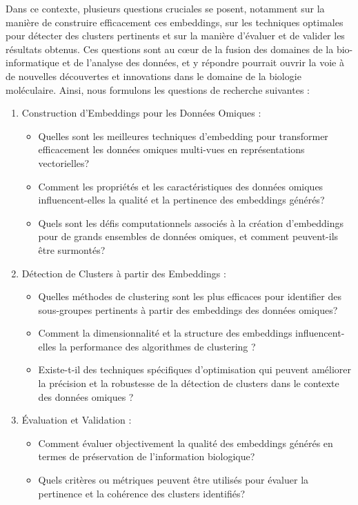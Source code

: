 Dans ce contexte, plusieurs questions cruciales se posent, notamment sur la manière de construire efficacement ces embeddings, sur les techniques optimales pour détecter des clusters pertinents et sur la manière d'évaluer et de valider les résultats obtenus. Ces questions sont au cœur de la fusion des domaines de la bio-informatique et de l'analyse des données, et y répondre pourrait ouvrir la voie à de nouvelles découvertes et innovations dans le domaine de la biologie moléculaire. Ainsi, nous formulons les questions de recherche suivantes :
\begin{enumerate}
 \item Construction d'Embeddings pour les Données Omiques :
    \begin{itemize}
            \item  Quelles sont les meilleures techniques d'embedding pour transformer efficacement les données omiques multi-vues en représentations vectorielles?
            \item  Comment les propriétés et les caractéristiques des données omiques influencent-elles la qualité et la pertinence des embeddings générés?
            \item Quels sont les défis computationnels associés à la création d'embeddings pour de grands ensembles de données omiques, et comment peuvent-ils être surmontés?
    \end{itemize}
\item Détection de Clusters à partir des Embeddings :
    \begin{itemize}
              \item Quelles méthodes de clustering sont les plus efficaces pour identifier des sous-groupes pertinents à partir des embeddings des données omiques?
             \item  Comment la dimensionnalité et la structure des embeddings influencent-elles la performance des algorithmes de clustering ?
              \item  Existe-t-il des techniques spécifiques d'optimisation qui peuvent améliorer la précision et la robustesse de la détection de clusters dans le contexte des données omiques ?
    \end{itemize}
\item Évaluation et Validation :
    \begin{itemize}
            \item  Comment évaluer objectivement la qualité des embeddings générés en termes de préservation de l'information biologique?
            \item  Quels critères ou métriques peuvent être utilisés pour évaluer la pertinence et la cohérence des clusters identifiés?

\end{itemize}
\end{enumerate}
